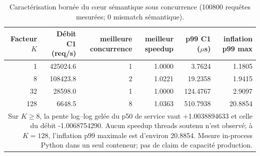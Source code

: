 \begin{table}[t]
\centering
\caption{Caractérisation bornée du cœur sémantique sous concurrence (100800 requêtes mesurées; 0 mismatch sémantique).}
\label{tab:v88-concurrency}
\small
\begin{tabular}{rrrrrr}
\hline
Facteur $K$ & Débit C1 (req/s) & meilleure concurrence & meilleur speedup & p99 C1 ($\mu$s) & inflation p99 max \\
\hline
1 & 425024.6 & 1 & 1.0000 & 3.7624 & 1.1805 \\
8 & 108423.8 & 2 & 1.0221 & 19.2358 & 1.9415 \\
32 & 28598.0 & 1 & 1.0000 & 124.4767 & 2.9097 \\
128 & 6648.5 & 8 & 1.0363 & 510.7938 & 20.8854 \\
\hline
\multicolumn{6}{p{0.92\textwidth}}{\footnotesize Sur $K\ge 8$, la pente log--log gelée du p50 de service vaut +1.0038894633 et celle du débit -1.0068754290. Aucun speedup threads soutenu n'est observé; à $K=128$, l'inflation p99 maximale est d'environ 20.8854. Mesure in-process Python dans un seul conteneur; pas de claim de capacité production.}\\
\end{tabular}
\end{table}
